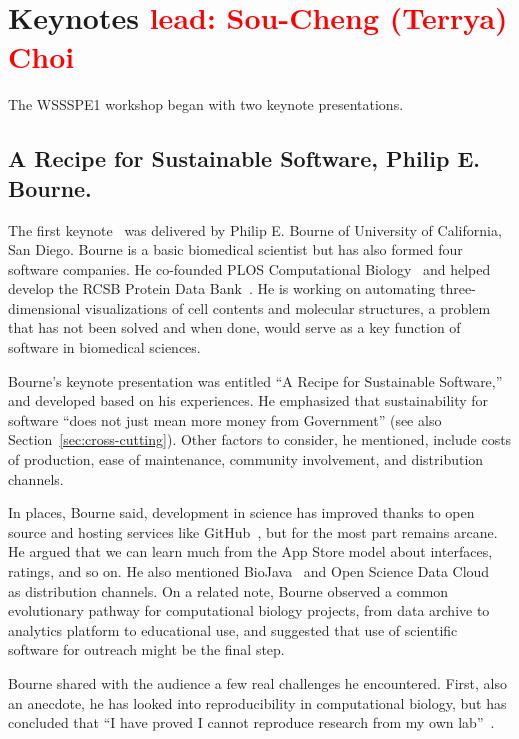 \documentclass[11pt, oneside]{amsart}
\newcommand{\note}[1]{ {\textcolor{red}    { #1 }}}
\begin{document}
\section{Keynotes \note{lead: Sou-Cheng (Terrya) Choi} } \label{sec:keynotes}

The WSSSPE1 workshop began with two keynote presentations.

\subsection{A Recipe for Sustainable Software, Philip E. Bourne.} \label{sec:keynote1}

The first keynote~\cite{WSSSPE1-keynote1} was delivered by Philip
E. Bourne of University of California, San Diego.  Bourne is a basic
biomedical scientist but has also formed four software companies. He co-founded
PLOS Computational Biology~\cite{plos-web} and helped develop the RCSB
Protein Data Bank~\cite{pdb-web}.
He is working on automating three-dimensional visualizations of cell
contents and molecular structures, a problem that has not been solved
and when done, would serve as a key function of software in biomedical
sciences.

Bourne's keynote presentation was entitled ``A Recipe for Sustainable
Software,'' and developed based on his experiences.  He emphasized that
sustainability for software ``does not just mean more money from
Government'' (see also Section~\ref{sec:cross-cutting}).  Other
factors to consider, he mentioned, include costs of production, ease
of maintenance, community involvement, and distribution channels.

In places, Bourne said, development in science has improved thanks to
open source and hosting services like GitHub~\cite{github-web}, but for the most part
remains arcane. He argued that we can learn much from the App Store
model about interfaces, ratings, and so on. He also mentioned
BioJava~\cite{biojava-web} and Open Science Data Cloud~\cite{osdc-web}
as distribution channels.  On a related note, Bourne observed a common
evolutionary pathway for computational biology projects, from data
archive to analytics platform to educational use, and suggested that
use of scientific software for outreach might be the final step.

Bourne shared with the audience a few real challenges he
encountered. First, also an anecdote, he has looked into
reproducibility in computational biology, but has concluded that ``I
have proved I cannot reproduce research from my own
lab''~\cite{Veretnik}.
\end{document}
